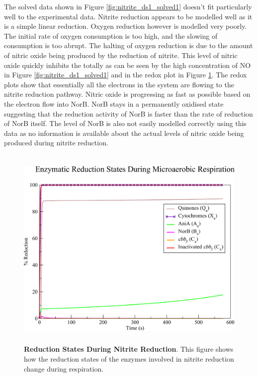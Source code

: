 The solved data shown in Figure \ref{fig:nitrite_ds1_solved1} doesn't fit particularly well to the experimental data. Nitrite reduction appears to be modelled well as it is a simple linear reduction. Oxygen reduction however is modelled very poorly. The initial rate of oxygen consumption is too high, and the slowing of consumption is too abrupt. The halting of oxygen reduction is due to the amount of nitric oxide being produced by the reduction of nitrite. This level of nitric oxide quickly inhibits the \cbbthree{} totally as can be seen by the high concentration of NO in Figure \ref{fig:nitrite_ds1_solved1} and in the redox plot in Figure \ref{fig:nitrite_ds1_redox1}. The redox plots show that essentially all the electrons in the system are flowing to the nitrite reduction pathway. Nitric oxide is progressing as fast as possible based on the electron flow into NorB. NorB stays in a permanently oxidised state suggesting that the reduction activity of NorB is faster than the rate of reduction of NorB
itself. The level of NorB is also not easily modelled correctly using this data as no information is available about the actual levels of nitric oxide being produced during nitrite reduction.

\begin{figure}[tbp]
 \centering
 \includegraphics[height=10cm, clip=true]{./07-nitritereduction/data/dataset1redox-1.pdf}
 \caption[Reduction States During Nitrite Reduction]{{\bf Reduction States During Nitrite Reduction}. This figure shows how the reduction states of the enzymes involved in nitrite reduction change during respiration.
  \label{fig:nitrite_ds1_redox1}}
\end{figure}

